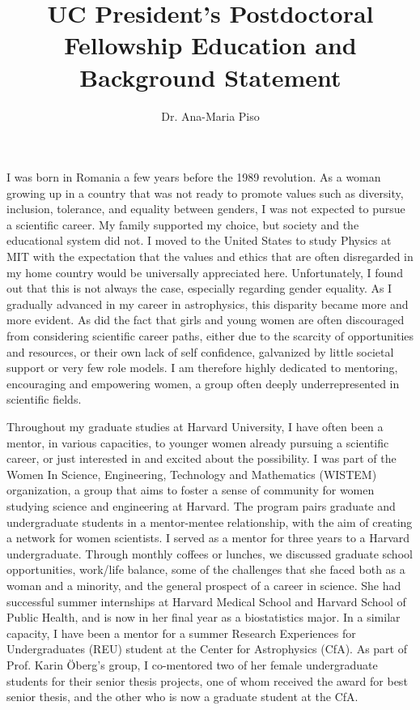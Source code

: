 \documentclass[12pt, letterpaper]{article}
\date{}
\title{\Large UC President's Postdoctoral Fellowship Education and Background Statement}
\author{Dr. Ana-Maria Piso}
\begin{document}
\maketitle


\vspace{-0.9cm}

I was born in Romania a few years before the 1989 revolution. As a woman growing up in a country that was not ready to promote values such as diversity, inclusion, tolerance, and equality between genders, I was not expected to pursue a scientific career. My family supported my choice, but society and the educational system did not. I moved to the United States to study Physics at MIT with the expectation that the values and ethics that are often disregarded in my home country would be universally appreciated here. Unfortunately, I found out that this is not always the case, especially regarding gender equality. As I gradually advanced in my career in astrophysics, this disparity became more and more evident. As did the fact that girls and young women are often discouraged from considering scientific career paths, either due to the scarcity of opportunities and resources, or their own lack of self confidence, galvanized by little societal support or very few role models. I am therefore highly dedicated to mentoring, encouraging and empowering women, a group often deeply underrepresented in scientific fields.  

Throughout my graduate studies at Harvard University, I have often been a mentor, in various capacities, to younger women already pursuing a scientific career, or just interested in and excited about the possibility. I was part of the Women In Science, Engineering, Technology and Mathematics (WISTEM) organization, a group that aims to foster a sense of community for women studying science and engineering at Harvard. The program pairs graduate and undergraduate students in a mentor-mentee relationship, with the aim of creating a network for women scientists. I served as a mentor for three years to a Harvard undergraduate. Through monthly coffees or lunches, we discussed graduate school opportunities, work/life balance, some of the challenges that she faced both as a woman and a minority, and the general prospect of a career in science. She had successful summer internships at Harvard Medical School and Harvard School of Public Health, and is now in her final year as a biostatistics major. In a similar capacity, I have been a mentor for a summer Research Experiences for Undergraduates (REU) student at the Center for Astrophysics (CfA). As part of Prof. Karin \"Oberg's group, I co-mentored two of her female undergraduate students for their senior thesis projects, one of whom received the award for best senior thesis, and the other who is now a graduate student at the CfA.   
\end{document}
